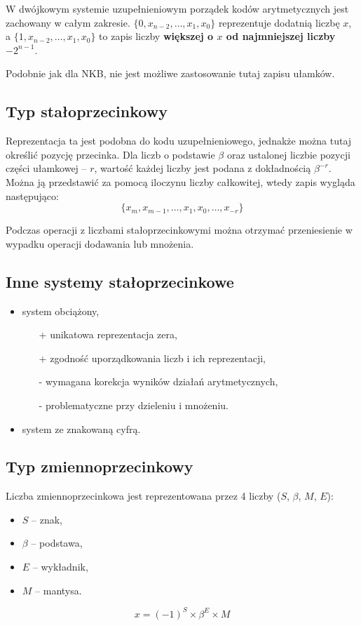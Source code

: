 W dwójkowym systemie uzupełnieniowym porządek kodów arytmetycznych jest zachowany w całym zakresie. $\{0, x_{n-2},\ldots,x_{1},x_{0}\}$ reprezentuje dodatnią liczbę $x$, a $\{1, x_{n-2},\ldots,x_{1},x_{0}\}$ to zapis liczby \textbf{większej o $x$ od najmniejszej liczby $-2^{n-1}$}.

Podobnie jak dla NKB, nie jest możliwe zastosowanie tutaj zapisu ułamków.

\subsection{Typ stałoprzecinkowy}
Reprezentacja ta jest podobna do kodu uzupełnieniowego, jednakże można tutaj określić pozycję przecinka. Dla liczb o podstawie $\beta$ oraz ustalonej liczbie pozycji części ułamkowej -- $r$, wartość każdej liczby jest podana z dokładnością $\beta^{-r}$. Można ją przedstawić za pomocą iloczynu liczby całkowitej, wtedy zapis wygląda następująco:
\begin{equation}
\{x_{m},x_{m-1},\ldots,x_{1},x_{0},\ldots,x_{-r}\}
\end{equation}

Podczas operacji z liczbami stałoprzecinkowymi można otrzymać przeniesienie w wypadku operacji dodawania lub mnożenia.

\subsection{Inne systemy stałoprzecinkowe}
\begin{itemize}
\item system obciążony,
\begin{itemize}
\item[+] unikatowa reprezentacja zera,
\item[+] zgodność uporządkowania liczb i ich reprezentacji,
\item[-] wymagana korekcja wyników działań arytmetycznych,
\item[-] problematyczne przy dzieleniu i mnożeniu.
\end{itemize}
\item system ze znakowaną cyfrą.
\end{itemize}

\subsection{Typ zmiennoprzecinkowy}

Liczba zmiennoprzecinkowa jest reprezentowana przez 4 liczby ($S$, $\beta$, $M$, $E$):
\begin{itemize}
\item $S$ -- znak,
\item $\beta$ -- podstawa,
\item $E$ -- wykładnik,
\item $M$ -- mantysa.
\end{itemize}
\begin{equation}
x = (-1)^{S} \times \beta^{E} \times M
\end{equation}

